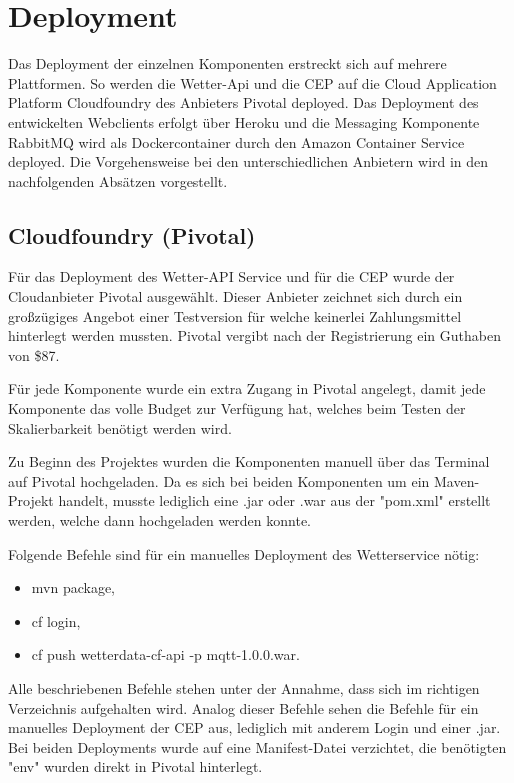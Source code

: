 \section{Deployment}
Das Deployment der einzelnen Komponenten erstreckt sich auf mehrere Plattformen. So werden die Wetter-Api und die CEP auf die Cloud Application Platform Cloudfoundry des Anbieters Pivotal deployed. Das Deployment des entwickelten Webclients erfolgt über Heroku und die Messaging Komponente RabbitMQ wird als Dockercontainer durch den Amazon Container Service deployed. Die Vorgehensweise bei den unterschiedlichen Anbietern wird in den nachfolgenden Absätzen vorgestellt.

\subsection{Cloudfoundry (Pivotal)}
Für das Deployment des Wetter-API Service und für die CEP wurde der Cloudanbieter Pivotal ausgewählt. Dieser Anbieter zeichnet sich durch ein großzügiges Angebot einer Testversion für welche keinerlei Zahlungsmittel hinterlegt werden mussten. Pivotal vergibt nach der Registrierung ein Guthaben von \$87. 

Für jede Komponente wurde ein extra Zugang in Pivotal angelegt, damit jede Komponente das volle Budget zur Verfügung hat, welches beim Testen der Skalierbarkeit benötigt werden wird. 

Zu Beginn des Projektes wurden die Komponenten manuell über das Terminal auf Pivotal hochgeladen. Da es sich bei beiden Komponenten um ein Maven-Projekt handelt, musste lediglich eine .jar oder .war aus der "pom.xml" erstellt werden, welche dann hochgeladen werden konnte. 

Folgende Befehle sind für ein manuelles Deployment des Wetterservice nötig: 

\begin{itemize}
\item mvn package, 
\item cf login, 
\item cf push wetterdata-cf-api -p mqtt-1.0.0.war.
\end{itemize}

Alle beschriebenen Befehle stehen unter der Annahme, dass sich im richtigen Verzeichnis aufgehalten wird. Analog dieser Befehle sehen die Befehle für ein manuelles Deployment der CEP aus, lediglich mit anderem Login und einer .jar. Bei beiden Deployments wurde auf eine Manifest-Datei verzichtet, die benötigten "env" wurden direkt in Pivotal hinterlegt. 

